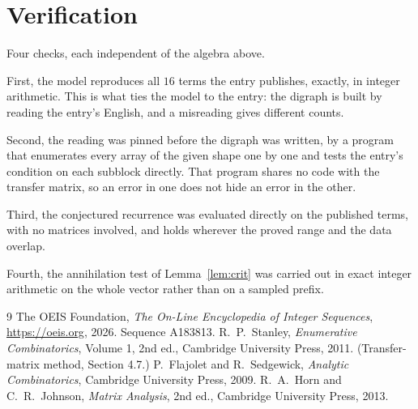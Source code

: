 \documentclass[11pt,a4paper]{article}
\theoremstyle{plain}
\theoremstyle{definition}
\begin{document}
\section{Verification}

Four checks, each independent of the algebra above.

First, the model reproduces all $16$ terms the entry publishes, exactly, in integer
arithmetic. This is what ties the model to the entry: the digraph is built by reading the
entry's English, and a misreading gives different counts.

Second, the reading was pinned before the digraph was written, by a program that enumerates
every array of the given shape one by one and tests the entry's condition on each subblock
directly. That program shares no code with the transfer matrix, so an error in one does not
hide an error in the other.

Third, the conjectured recurrence was evaluated directly on the published terms, with no
matrices involved, and holds wherever the proved range and the data overlap.

Fourth, the annihilation test of Lemma~\ref{lem:crit} was carried out in exact integer
arithmetic on the whole vector rather than on a sampled prefix.

\begin{thebibliography}{9}
 The OEIS Foundation, \emph{The On-Line Encyclopedia of Integer
Sequences}, \url{https://oeis.org}, 2026. Sequence A183813.
 R.~P.~Stanley, \emph{Enumerative Combinatorics}, Volume 1, 2nd ed.,
Cambridge University Press, 2011. (Transfer-matrix method, Section 4.7.)
 P.~Flajolet and R.~Sedgewick, \emph{Analytic Combinatorics}, Cambridge
University Press, 2009.
 R.~A.~Horn and C.~R.~Johnson, \emph{Matrix Analysis}, 2nd ed., Cambridge
University Press, 2013.
\end{thebibliography}
\end{document}
